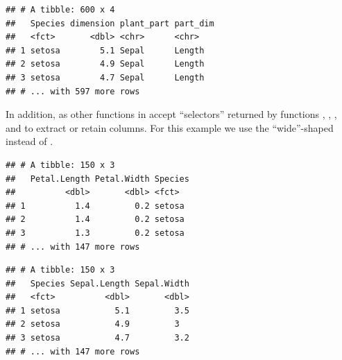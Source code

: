 \documentclass[krantz2]{krantz}\usepackage{knitr}
\begin{document}
\begin{knitrout}\footnotesize
{}\color{fgcolor}\begin{kframe}
\begin{alltt}
 \hlopt{-}
\end{alltt}
\begin{verbatim}
## # A tibble: 600 x 4
##   Species dimension plant_part part_dim
##   <fct>       <dbl> <chr>      <chr>   
## 1 setosa        5.1 Sepal      Length  
## 2 setosa        4.9 Sepal      Length  
## 3 setosa        4.7 Sepal      Length  
## # ... with 597 more rows
\end{verbatim}
\end{kframe}
\end{knitrout}

In addition,  as other functions in  accept ``selectors'' returned by functions , , , and  to extract or retain columns. For this example we use the ``wide''-shaped  instead of .

\begin{knitrout}\footnotesize
{}\color{fgcolor}\begin{kframe}
\begin{alltt}
 \hlopt{-}\hlstd{(}\hlstd{))}
\end{alltt}
\begin{verbatim}
## # A tibble: 150 x 3
##   Petal.Length Petal.Width Species
##          <dbl>       <dbl> <fct>  
## 1          1.4         0.2 setosa 
## 2          1.4         0.2 setosa 
## 3          1.3         0.2 setosa 
## # ... with 147 more rows
\end{verbatim}
\end{kframe}
\end{knitrout}

\begin{knitrout}\footnotesize
{}\color{fgcolor}\begin{kframe}
\begin{alltt}
 \hlstd{(}\hlstd{))}
\end{alltt}
\begin{verbatim}
## # A tibble: 150 x 3
##   Species Sepal.Length Sepal.Width
##   <fct>          <dbl>       <dbl>
## 1 setosa           5.1         3.5
## 2 setosa           4.9         3  
## 3 setosa           4.7         3.2
## # ... with 147 more rows
\end{verbatim}
\end{kframe}
\end{knitrout}
\end{document}
